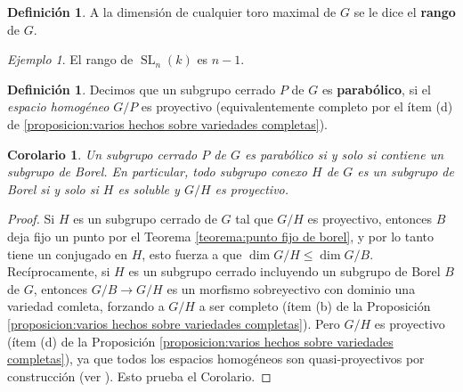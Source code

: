 \documentclass[spanish,10pt]{amsart}
\newtheorem{corollary}[theorem]{Corolario}
\theoremstyle{definition}
\newtheorem{definition}[theorem]{Definición}
\theoremstyle{remark}
\newtheorem{example}[theorem]{Ejemplo}
\numberwithin{equation}{section}
\begin{document}
\begin{definition}
A la dimensión de cualquier toro maximal de $G$ se le dice el \textbf{rango} de $G$.
\end{definition}

\begin{example}
El rango de $\operatorname{SL}_n (k)$ es $n-1$.
\end{example}

\begin{definition}
Decimos que un subgrupo cerrado $P$ de $G$ es \textbf{parabólico}, si el \textit{espacio homogéneo} $G/P$ es proyectivo (equivalentemente completo por el ítem (d) de \ref{proposicion:varios hechos sobre variedades completas}).
\end{definition}

\begin{corollary}\label{corolario:un subgrupo cerrado es parabolico si y solo si incluye un subgrupo de borel}
Un subgrupo cerrado $P$ de $G$ es parabólico si y solo si contiene un subgrupo de Borel. En particular, todo subgrupo conexo $H$ de $G$ es un subgrupo de Borel si y solo si $H$ es soluble y $G/H$ es proyectivo.
\end{corollary}
\begin{proof}
Si $H$ es un subgrupo cerrado de $G$ tal que $G/H$ es proyectivo, entonces $B$ deja fijo un punto por el Teorema \ref{teorema:punto fijo de borel}, y por lo tanto tiene un conjugado en $H$, esto fuerza a que $\dim G/H \leq \dim G/B$. Recíprocamente, si $H$ es un subgrupo cerrado incluyendo un subgrupo de Borel $B$ de $G$, entonces $G/B \to G/H$ es un morfismo sobreyectivo con dominio una variedad comleta, forzando a $G/H$ a ser completo (ítem (b) de la Proposición \ref{proposicion:varios hechos sobre variedades completas}). Pero $G/H$ es proyectivo (ítem (d) de la Proposición \ref{proposicion:varios hechos sobre variedades completas}), ya que todos los espacios homogéneos son quasi-proyectivos por construcción (ver \cite[(11.3)]{humphreys2012linearAlgebraicGroups}). Esto prueba el Corolario.
\end{proof}
\end{document}
